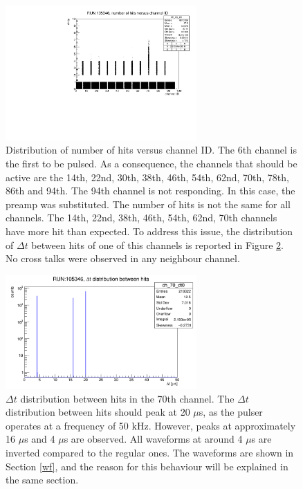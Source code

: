 \begin{figure}[!h]
  \centering
  \includegraphics[width=0.65\textwidth]{figures/pdf/run105346_nh_vs_ch.pdf}
  \caption[The occupancy plot (dead channel and more hits than expected).]{Distribution of number of hits versus channel ID. 
  The 6th channel is the first to be pulsed.
  As a consequence, the channels that should be active are the 
  14th, 22nd, 30th, 38th, 46th, 54th, 62nd, 70th, 78th, 86th and 94th. 
  The 94th channel is not responding. In this case, the preamp 
  was substituted. The number of hits is not the same 
  for all channels. The 14th, 22nd, 38th, 46th, 54th, 62nd, 
  70th channels have more hit than expected.
  To address this issue, the distribution of $\Delta t$ between 
  hits of one of this channels is reported in Figure \ref{fig:deltatnhits}.
  No cross talks were observed in any neighbour channel.}
 \label{fig:dead}
\end{figure}


\begin{figure}[!h]
  \centering
  \includegraphics[width=0.65\textwidth]{figures/png/deltathits.png}
  \caption[$\Delta t$ distribution between hits in the 70th channel.]{$\Delta t$ distribution between hits in the 70th channel. The $\Delta t$ distribution between hits 
  should peak at 20 $\mu$s, as the pulser operates at a frequency of 50 kHz. However, peaks at approximately 
  16 $\mu$s and 4 $\mu$s are observed. All waveforms at around 4 $\mu$s are inverted compared to the regular ones. 
  The waveforms are shown in Section \ref{wf}, and the reason for this behaviour will be explained in the same section.}
 \label{fig:deltatnhits}
\end{figure}

